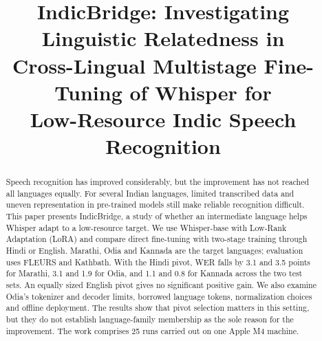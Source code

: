 \documentclass[conference]{IEEEtran}
\begin{document}
\title{IndicBridge: Investigating Linguistic Relatedness in\\
Cross-Lingual Multistage Fine-Tuning of Whisper for\\
Low-Resource Indic Speech Recognition}

\author{
\and
{}
\and
{}
\and
{}
}

\maketitle

\begin{abstract}
Speech recognition has improved considerably, but the improvement has not reached all languages equally. For several Indian languages, limited transcribed data and uneven representation in pre-trained models still make reliable recognition difficult. This paper presents IndicBridge, a study of whether an intermediate language helps Whisper adapt to a low-resource target. We use Whisper-base with Low-Rank Adaptation (LoRA) and compare direct fine-tuning with two-stage training through Hindi or English. Marathi, Odia and Kannada are the target languages; evaluation uses FLEURS and Kathbath. With the Hindi pivot, WER falls by 3.1 and 3.5 points for Marathi, 3.1 and 1.9 for Odia, and 1.1 and 0.8 for Kannada across the two test sets. An equally sized English pivot gives no significant positive gain. We also examine Odia's tokenizer and decoder limits, borrowed language tokens, normalization choices and offline deployment. The results show that pivot selection matters in this setting, but they do not establish language-family membership as the sole reason for the improvement. The work comprises 25 runs carried out on one Apple M4 machine.
\end{abstract}
\end{document}
